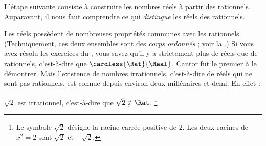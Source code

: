 \documentclass[../../../include/open-logic-section]{subfiles}
\begin{document}

L'étape suivante consiste à construire les nombres réels à partir des
rationnels. Auparavant, il nous faut comprendre ce qui \emph{distingue}
les réels des rationnels.

Les réels possèdent de nombreuses propriétés communes avec les rationnels.
(Techniquement, ces deux ensembles sont des \emph{corps ordonnés} ; voir
la .) Si vous avez résolu les
exercices du , vous savez qu'il y a strictement plus
de réels que de rationnels, c'est-à-dire que $\cardless{\Rat}{\Real}$.
Cantor fut le premier à le démontrer. Mais l'existence de nombres
irrationnels, c'est-à-dire de réels qui ne sont pas rationnels, est connue
depuis environ deux millénaires et demi. En effet :
\begin{thm}
$\sqrt{2}$ est irrationnel, c'est-à-dire que $\sqrt{2} \notin \Rat$.
\footnote{Le symbole $\sqrt{2}$ désigne la racine carrée positive de $2$. Les deux racines de $x^2=2$ sont $\sqrt{2}$ et $-\sqrt{2}$.}\end{thm}
\end{document}
